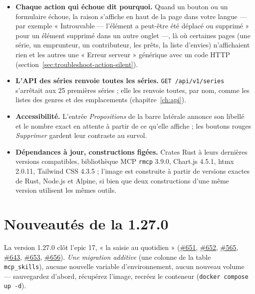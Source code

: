\begin{itemize}
  \item \textbf{Chaque action qui échoue dit pourquoi.} Quand un bouton
        ou un formulaire échoue, la raison s'affiche en haut de la page
        dans votre langue --- par exemple « Introuvable --- l'élément a
        peut-être été déplacé ou supprimé » pour un élément supprimé
        dans un autre onglet ---, là où certaines pages (une série, un
        emprunteur, un contributeur, les prêts, la liste d'envies)
        n'affichaient rien et les autres une « Erreur serveur »
        générique avec un code HTTP
        (section~\ref{sec:troubleshoot-action-silent}).
  \item \textbf{L'API des séries renvoie toutes les séries.}
        \texttt{GET /api/v1/series} s'arrêtait aux 25 premières séries ;
        elle les renvoie toutes, par nom, comme les listes des genres et
        des emplacements (chapitre~\ref{ch:api}).
  \item \textbf{Accessibilité.} L'entrée \emph{Propositions} de la barre
        latérale annonce son libellé et le nombre exact en attente à
        partir de ce qu'elle affiche ; les boutons rouges
        \emph{Supprimer} gardent leur contraste au survol.
  \item \textbf{Dépendances à jour, constructions figées.} Crates Rust à
        leurs dernières versions compatibles, bibliothèque MCP
        \texttt{rmcp} 3.9.0, Chart.js 4.5.1, htmx 2.0.11, Tailwind CSS
        4.3.5 ; l'image est construite à partir de versions exactes de
        Rust, Node.js et Alpine, si bien que deux constructions d'une
        même version utilisent les mêmes outils.
\end{itemize}

\section{Nouveautés de la 1.27.0}\label{sec:whats-new-1.27.0}

La version 1.27.0 clôt l'epic 17, « la saisie au quotidien »
(\href{https://github.com/guycorbaz/mybibli/issues/651}{\#651},
\href{https://github.com/guycorbaz/mybibli/issues/652}{\#652},
\href{https://github.com/guycorbaz/mybibli/issues/565}{\#565},
\href{https://github.com/guycorbaz/mybibli/issues/643}{\#643},
\href{https://github.com/guycorbaz/mybibli/issues/653}{\#653},
\href{https://github.com/guycorbaz/mybibli/issues/656}{\#656}).
\emph{Une migration additive} (une colonne de la table
\texttt{mcp\_skills}), aucune nouvelle variable d'environnement, aucun
nouveau volume --- sauvegardez d'abord, récupérez l'image, recréez le
conteneur (\texttt{docker compose up -d}).

